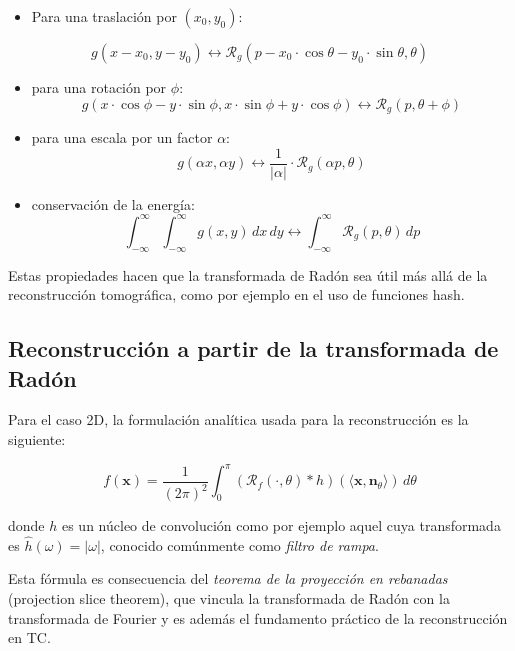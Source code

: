 \begin{itemize}
    \item Para una traslación por $(x_0, y_0)$:
\end{itemize}

\begin{equation}
g(x - x_0, y - y_0) \longleftrightarrow \mathcal{R}_g(p - x_0 \cdot \cos \theta - y_0 \cdot \sin \theta, \theta) 
\end{equation}

\begin{itemize}
    \item para una rotación por $\phi$:
    \[
    g(x \cdot \cos \phi - y \cdot \sin \phi, x \cdot \sin \phi + y \cdot \cos \phi) \longleftrightarrow \mathcal{R}_g(p, \theta + \phi) \tag{2.6}
    \]
    
    \item para una escala por un factor $\alpha$:
    \[
    g(\alpha x, \alpha y) \longleftrightarrow \frac{1}{|\alpha|} \cdot \mathcal{R}_g(\alpha p, \theta) \tag{2.7}
    \]
    
    \item conservación de la energía:
    \[
    \int_{-\infty}^{\infty} \int_{-\infty}^{\infty} g(x,y) \, dx \, dy \longleftrightarrow \int_{-\infty}^{\infty} \mathcal{R}_g(p,\theta) \, dp \tag{2.8}
    \]
\end{itemize}

Estas propiedades hacen que la transformada de Radón sea útil más allá de la reconstrucción tomográfica, como por ejemplo en el uso de funciones hash.

\subsection{Reconstrucción a partir de la transformada de Radón}

Para el caso 2D, la formulación analítica usada para la reconstrucción es la siguiente:

\[
f(\mathbf{x}) = \frac{1}{(2\pi)^2} \int_{0}^{\pi} \left(\mathcal{R}_f(\cdot,\theta) * h \right)(\langle \mathbf{x}, \mathbf{n}_\theta \rangle) \, d\theta \tag{2.9}
\]


donde $h$ es un núcleo de convolución como por ejemplo aquel cuya transformada es $\hat{h}(\omega) = |\omega|$, conocido comúnmente como \textit{filtro de rampa}.

Esta fórmula es consecuencia del \textit{teorema de la proyección en rebanadas} (projection slice theorem), que vincula la transformada de Radón con la transformada de Fourier y es además el fundamento práctico de la reconstrucción en TC.

